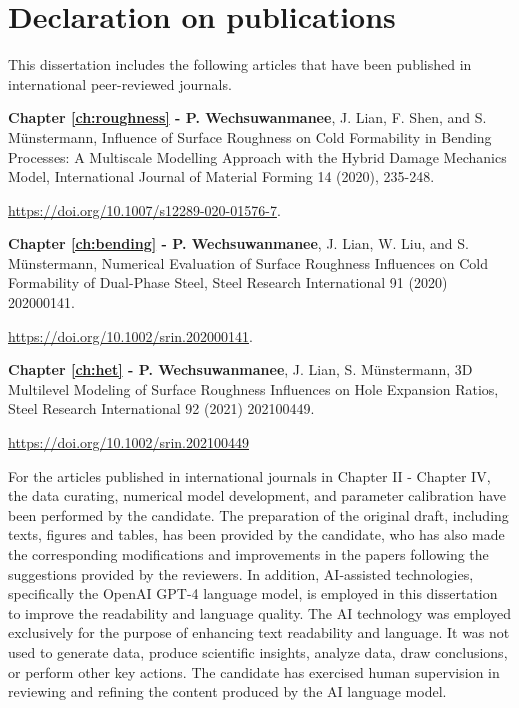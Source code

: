 \chapter*{Declaration on publications}

This dissertation includes the following articles that have been published in international peer-reviewed journals.

\vspace{20pt}

\textbf{Chapter \ref{ch:roughness} - P. Wechsuwanmanee}, J. Lian, F. Shen, and S. Münstermann, Influence of Surface Roughness on Cold Formability in Bending Processes: A Multiscale Modelling Approach with the Hybrid Damage Mechanics Model, International Journal of Material Forming 14 (2020), 235-248.

\vspace{5pt}

\noindent \url{https://doi.org/10.1007/s12289-020-01576-7}.

\vspace{20pt}

\textbf{Chapter \ref{ch:bending} - P. Wechsuwanmanee}, J. Lian, W. Liu, and S. Münstermann, Numerical Evaluation of Surface Roughness Influences on Cold Formability of Dual-Phase Steel, Steel Research International 91 (2020) 202000141.

\vspace{5pt}

\noindent \url{https://doi.org/10.1002/srin.202000141}.

\vspace{20pt}

\textbf{Chapter \ref{ch:het} - P. Wechsuwanmanee}, J. Lian, S. Münstermann, 3D Multilevel Modeling of Surface Roughness Influences on Hole Expansion Ratios, Steel Research International 92 (2021) 202100449.

\vspace{5pt}

\noindent \url{https://doi.org/10.1002/srin.202100449}

\vspace{20pt}

For the articles published in international journals in Chapter II - Chapter IV, the data curating, numerical model development, and parameter calibration have been performed by the candidate. The preparation of the original draft, including texts, figures and tables, has been provided by the candidate, who has also made the corresponding modifications and improvements in the papers following the suggestions provided by the reviewers.
In addition, AI-assisted technologies, specifically the OpenAI GPT-4 language model, is employed in this dissertation to improve the readability and language quality. The AI technology was employed exclusively for the purpose of enhancing text readability and language. It was not used to generate data, produce scientific insights, analyze data, draw conclusions, or perform other key actions. The candidate has exercised human supervision in reviewing and refining the content produced by the AI language model.